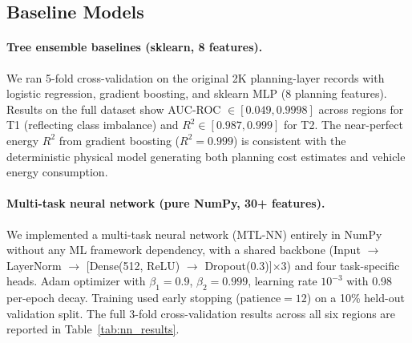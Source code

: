 ﻿\documentclass{article}
\begin{document}
\subsection{Baseline Models}

\paragraph{Tree ensemble baselines (sklearn, 8 features).}
We ran 5-fold cross-validation on the original 2K planning-layer records
with logistic regression, gradient boosting, and sklearn MLP (8 planning
features). Results on the full dataset \citep{baseline_experiments} show
AUC-ROC $\in [0.049, 0.9998]$ across regions for T1 (reflecting class
imbalance) and $R^2 \in [0.987, 0.999]$ for T2. The near-perfect energy
$R^2$ from gradient boosting ($R^2 = 0.999$) is consistent with the
deterministic physical model generating both planning cost estimates and
vehicle energy consumption.

\paragraph{Multi-task neural network (pure NumPy, 30+ features).}
We implemented a multi-task neural network (MTL-NN) entirely in NumPy
without any ML framework dependency, with a shared backbone
(Input $\to$ LayerNorm $\to$ [Dense(512, ReLU) $\to$ Dropout(0.3)]$\times$3)
and four task-specific heads. Adam optimizer with $\beta_1=0.9$,
$\beta_2=0.999$, learning rate $10^{-3}$ with 0.98 per-epoch decay.
Training used early stopping ($\text{patience}=12$) on a 10\% held-out
validation split. The full 3-fold cross-validation results across all six
regions are reported in Table~\ref{tab:nn_results}.
\end{document}
